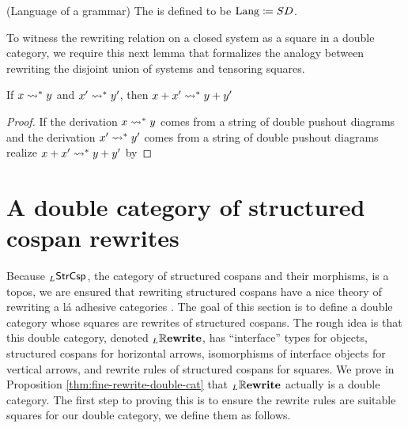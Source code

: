 \documentclass{amsart}
\begin{document}
\begin{definition}(Language of a grammar)
  The  is defined to be
  $ \mathrm{Lang} \coloneqq SD $. 
\end{definition}

To witness the rewriting relation on a closed system as a
square in a double category, we require this next lemma
that formalizes the analogy between rewriting the disjoint
union of systems and tensoring squares.

\begin{lemma} \label{thm:rewrite-rel-is-additive}
  If $ x \rightsquigarrow^\ast y $ and $ x' \rightsquigarrow^\ast y' $, then
  $ x+x' \rightsquigarrow^\ast y+y' $
\end{lemma}

\begin{proof}
  If the derivation $ x \rightsquigarrow^\ast y $ comes from a string of
  double pushout diagrams
   and the derivation
  $ x' \rightsquigarrow^\ast y' $ comes from a string of double pushout
  diagrams  realize
  $ x+x' \rightsquigarrow^\ast y+y' $ by
  
\end{proof}

\section{A double category of structured cospan rewrites}
\label{sec:DblCat}


Because $ _L\mathsf{StrCsp} $, the category of structured cospans
and their morphisms, is a topos, we are ensured that
rewriting structured cospans have a nice theory of rewriting
a l\'{a} adhesive categories \cite{LackSobo_Adhesive}.
The goal of this section is to define a double category whose squares
are rewrites of structured cospans.  The rough idea is
that this double category, denoted $ _L\mathbb{R}\mathbf{ewrite} $, has
``interface'' types for objects, structured cospans for
horizontal arrows, isomorphisms of interface objects for
vertical arrows, and rewrite rules of structured
cospans for squares. We prove in Proposition
\ref{thm:fine-rewrite-double-cat} that $ _L\mathbb{R}\mathbf{ewrite} $
actually is a double category. The first step to proving
this is to ensure the rewrite rules are suitable squares for
our double category, we define them as follows.
\end{document}
